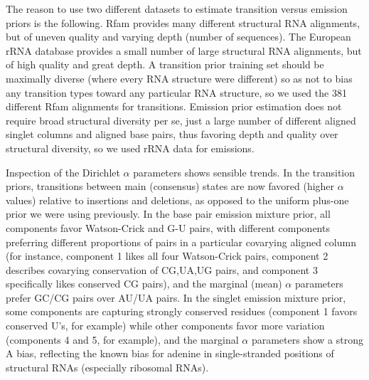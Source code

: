\documentclass[11pt]{article}
\newif\ifdraft
\begin{document}
The reason to use two different datasets to estimate transition versus
emission priors is the following. Rfam provides many different
structural RNA alignments, but of uneven quality and varying depth
(number of sequences). The European rRNA database provides a small
number of large structural RNA alignments, but of high quality and
great depth.  A transition prior training set should be maximally
diverse (where every RNA structure were different) so as not to bias
any transition types toward any particular RNA structure, so we used
the 381 different Rfam alignments for transitions.  Emission prior
estimation does not require broad structural diversity per se, just a
large number of different aligned singlet columns and aligned base
pairs, thus favoring depth and quality over structural diversity, so
we used rRNA data for emissions.

Inspection of the Dirichlet $\alpha$ parameters shows sensible
trends. In the transition priors, transitions between main (consensus)
states are now favored (higher $\alpha$ values) relative to insertions
and deletions, as opposed to the uniform plus-one prior we were using
previously. In the base pair emission mixture prior, all components
favor Watson-Crick and G-U pairs, with different components preferring
different proportions of pairs in a particular covarying aligned
column (for instance, component 1 likes all four Watson-Crick pairs,
component 2 describes covarying conservation of CG,UA,UG pairs, and
component 3 specifically likes conserved CG pairs), and the marginal
(mean) $\alpha$ parameters prefer GC/CG pairs over AU/UA pairs. In the
singlet emission mixture prior, some components are capturing strongly
conserved residues (component 1 favors conserved U's, for example)
while other components favor more variation (components 4 and 5, for
example), and the marginal $\alpha$ parameters show a strong A bias,
reflecting the known bias for adenine in single-stranded positions of
structural RNAs (especially ribosomal RNAs).


\ifdraft

\fi

\ifdraft

\fi

\ifdraft

\fi
\end{document}
